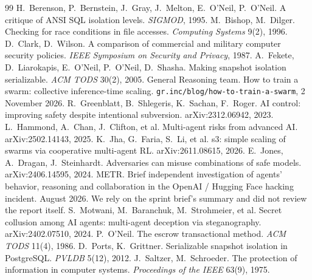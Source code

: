 \documentclass[10pt]{article}
\begin{document}
\vspace{-.7em}\begin{thebibliography}{99}\footnotesize\setlength{\itemsep}{0pt}
 H.~Berenson, P.~Bernstein, J.~Gray, J.~Melton, E.~O'Neil, P.~O'Neil. A critique of ANSI SQL isolation levels. \emph{SIGMOD}, 1995.
 M.~Bishop, M.~Dilger. Checking for race conditions in file accesses. \emph{Computing Systems} 9(2), 1996.
 D.~Clark, D.~Wilson. A comparison of commercial and military computer security policies. \emph{IEEE Symposium on Security and Privacy}, 1987.
 A.~Fekete, D.~Liarokapis, E.~O'Neil, P.~O'Neil, D.~Shasha. Making snapshot isolation serializable. \emph{ACM TODS} 30(2), 2005.
 General Reasoning team. How to train a swarm: collective inference-time scaling. \texttt{gr.inc/blog/how-to-train-a-swarm}, 2 November 2026.
 R.~Greenblatt, B.~Shlegeris, K.~Sachan, F.~Roger. AI control: improving safety despite intentional subversion. arXiv:2312.06942, 2023.
 L.~Hammond, A.~Chan, J.~Clifton, et al. Multi-agent risks from advanced AI. arXiv:2502.14143, 2025.
 K.~Jha, G.~Faria, S.~Li, et al. s3: simple scaling of swarms via cooperative multi-agent RL. arXiv:2611.08615, 2026.
 E.~Jones, A.~Dragan, J.~Steinhardt. Adversaries can misuse combinations of safe models. arXiv:2406.14595, 2024.
 METR. Brief independent investigation of agents' behavior, reasoning and collaboration in the OpenAI / Hugging Face hacking incident. August 2026. We rely on the sprint brief's summary and did not review the report itself.
 S.~Motwani, M.~Baranchuk, M.~Strohmeier, et al. Secret collusion among AI agents: multi-agent deception via steganography. arXiv:2402.07510, 2024.
 P.~O'Neil. The escrow transactional method. \emph{ACM TODS} 11(4), 1986.
 D.~Ports, K.~Grittner. Serializable snapshot isolation in PostgreSQL. \emph{PVLDB} 5(12), 2012.
 J.~Saltzer, M.~Schroeder. The protection of information in computer systems. \emph{Proceedings of the IEEE} 63(9), 1975.
\end{thebibliography}

\appendix
\end{document}
